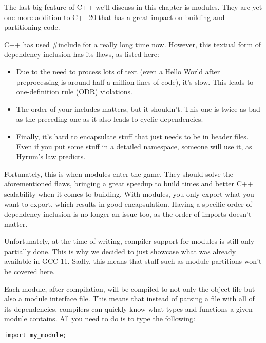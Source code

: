 The last big feature of C++ we'll discuss in this chapter is modules. They are yet one more addition to C++20 that has a great impact on building and partitioning code.

C++ has used \#include for a really long time now. However, this textual form of dependency inclusion has its flaws, as listed here:

\begin{itemize}
\item 
Due to the need to process lots of text (even a Hello World after preprocessing is around half a million lines of code), it's slow. This leads to one-definition rule (ODR) violations.

\item 
The order of your includes matters, but it shouldn't. This one is twice as bad as
the preceding one as it also leads to cyclic dependencies.

\item 
Finally, it's hard to encapsulate stuff that just needs to be in header files. Even if you put some stuff in a detailed namespace, someone will use it, as Hyrum's law predicts.
\end{itemize}

Fortunately, this is when modules enter the game. They should solve the aforementioned flaws, bringing a great speedup to build times and better C++ scalability when it comes to building. With modules, you only export what you want to export, which results in good encapsulation. Having a specific order of dependency inclusion is no longer an issue too, as the order of imports doesn't matter.

\begin{tcolorbox}[colback=blue!5!white,colframe=blue!75!black, title=Note]
\hspace*{0.7cm}Unfortunately, at the time of writing, compiler support for modules is still only partially done. This is why we decided to just showcase what was already available in GCC 11. Sadly, this means that stuff such as module partitions won't be covered here.
\end{tcolorbox}

Each module, after compilation, will be compiled to not only the object file but also a module interface file. This means that instead of parsing a file with all of its dependencies, compilers can quickly know what types and functions a given module contains. All you need to do is to type the following:

\begin{lstlisting}[style=styleCXX]
import my_module;
\end{lstlisting}


